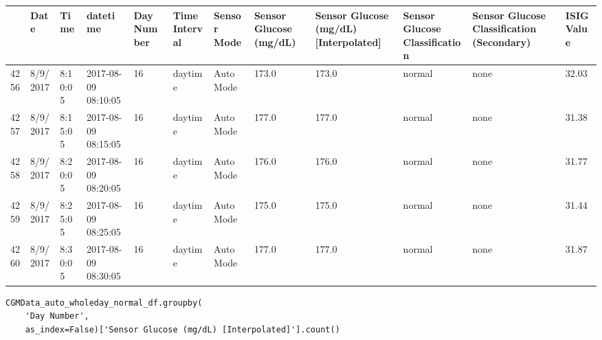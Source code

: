 \bigskip\noindent
\begin{tabular}{p{}p{}p{}p{}p{}p{}p{}p{}p{}p{}p{}p{}}
\toprule
 & Date & Time & datetime & Day Number & Time Interval & Sensor Mode & Sensor Glucose (mg/dL) & Sensor Glucose (mg/dL) [Interpolated] & Sensor Glucose Classification & Sensor Glucose Classification (Secondary) & ISIG Value \\
\hline
4256 & 8/9/2017 & 8:10:05 & 2017-08-09 08:10:05 & 16 & daytime & Auto Mode & 173.0 & 173.0 & normal & none & 32.03 \\
\hline
4257 & 8/9/2017 & 8:15:05 & 2017-08-09 08:15:05 & 16 & daytime & Auto Mode & 177.0 & 177.0 & normal & none & 31.38 \\
\hline
4258 & 8/9/2017 & 8:20:05 & 2017-08-09 08:20:05 & 16 & daytime & Auto Mode & 176.0 & 176.0 & normal & none & 31.77 \\
\hline
4259 & 8/9/2017 & 8:25:05 & 2017-08-09 08:25:05 & 16 & daytime & Auto Mode & 175.0 & 175.0 & normal & none & 31.44 \\
\hline
4260 & 8/9/2017 & 8:30:05 & 2017-08-09 08:30:05 & 16 & daytime & Auto Mode & 177.0 & 177.0 & normal & none & 31.87 \\
\hline
\bottomrule
\end{tabular}

\bigskip

\begin{verbatim}
CGMData_auto_wholeday_normal_df.groupby(
    'Day Number',
    as_index=False)['Sensor Glucose (mg/dL) [Interpolated]'].count()
\end{verbatim}

